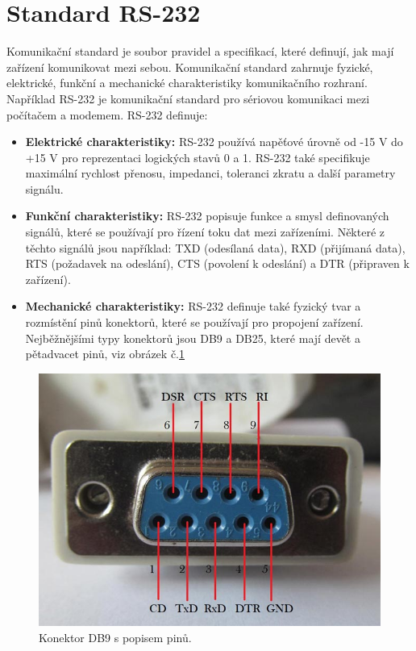 \section{Standard RS-232}
Komunikační standard je soubor pravidel a specifikací, které definují, jak mají zařízení komunikovat mezi sebou. Komunikační standard zahrnuje fyzické, elektrické, funkční a mechanické charakteristiky komunikačního rozhraní. Například RS-232 je komunikační standard pro sériovou komunikaci mezi počítačem a modemem.
RS-232 definuje:
\begin{itemize}
    \item \textbf{Elektrické charakteristiky:} RS-232 používá napěťové úrovně od -15 V do +15 V pro reprezentaci logických stavů 0 a 1. RS-232 také specifikuje maximální rychlost přenosu, impedanci, toleranci zkratu a další parametry signálu.
    \item \textbf{Funkční charakteristiky:} RS-232 popisuje funkce a smysl definovaných signálů, které se používají pro řízení toku dat mezi zařízeními. Některé z těchto signálů jsou například: TXD (odesílaná data), RXD (přijímaná data), RTS (požadavek na odeslání), CTS (povolení k odeslání) a DTR (připraven k zařízení).
    \item \textbf{Mechanické charakteristiky:} RS-232 definuje také fyzický tvar a rozmístění pinů konektorů, které se používají pro propojení zařízení. Nejběžnějšími typy konektorů jsou DB9 a DB25, které mají devět a pětadvacet pinů, viz obrázek č.\ref{rs232_obr} \cite{ser kom}
\end{itemize}

\begin{figure}[!h]
    \begin{center}
        \includegraphics[scale=0.4]{obrazky/RS232.jpeg}
    \end{center}
    \label{rs232_obr}
    \caption{Konektor DB9 s popisem pinů. \cite{RS232}}
\end{figure}

